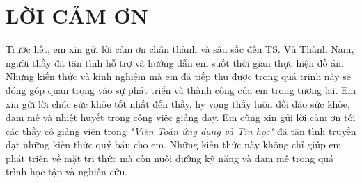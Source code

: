 \chapter*{\centering LỜI CẢM ƠN}


Trước hết, em xin gửi lời cảm ơn chân thành và sâu sắc đến TS. Vũ Thành Nam, người thầy đã tận tình hỗ trợ và hướng dẫn em suốt thời gian thực hiện đồ án.          Những kiến thức và kinh nghiệm mà em đã tiếp thu được trong quá trình này sẽ đóng góp quan trọng vào sự phát triển và thành công của em trong tương lai.          Em xin gửi  lời chúc sức khỏe tốt nhất đến thầy, hy vọng thầy   luôn dồi dào sức khỏe, đam mê và nhiệt huyết trong công việc giảng dạy.
Em cũng xin gửi lời cảm ơn tới các thầy cô giảng viên trong \emph{"Viện Toán ứng dụng và Tin học"} đã tận tình truyền đạt những kiến thức quý báu cho em.             Những kiến thức này không chỉ giúp em phát triển về mặt tri thức mà còn nuôi dưỡng kỹ năng và đam mê trong quá trình học tập và nghiên cứu.











